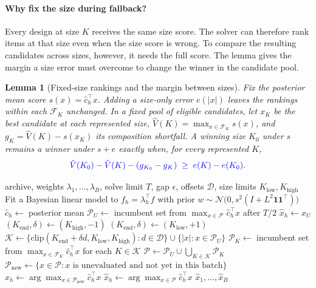 \documentclass{article}
\newcommand{\revtext}[1]{{\color{blue}#1}}
\providecommand{\one}{\mathbf 1}
\providecommand{\F}{\mathcal F}
\newtheorem{lemma}[proposition]{Lemma}
\theoremstyle{remark}\newtheorem{remark}[proposition]{Remark}
\begin{document}
\paragraph{\revtext{Why fix the size during fallback?}}
\revtext{Every design at size $K$ receives the same size score. The solver can therefore rank items at that size even when the size score is wrong. To compare the resulting candidates across sizes, however, it needs the full score. The lemma gives the margin a size error must overcome to change the winner in the candidate pool.}
\begin{lemma}[\revtext{Fixed-size rankings and the margin between sizes}]\label{prop:inv}
\revtext{Fix the posterior mean score $s(x)=\hat c_h^\top x$. Adding a size-only error $e(|x|)$ leaves the rankings within each $\F_K$ unchanged. In a fixed pool of eligible candidates, let $x_K$ be the best candidate at each represented size, $\hat V(K)=\max_{x\in\F_K}s(x)$, and $g_K=\hat V(K)-s(x_K)$ its composition shortfall. A winning size $K_0$ under $s$ remains a winner under $s+e$ exactly when, for every represented $K$,}
\begin{equation}\label{eq:fallback-margin}
{\color{blue}\hat V(K_0)-\hat V(K)-(g_{K_0}-g_K) \;\ge\; e(K)-e(K_0).}
\end{equation}
\end{lemma}

\begin{algorithm}[t]
\caption{\revtext{One C3BO batch}}
\label{alg:c3bo}
\small\color{blue}
\begin{algorithmic}[1]
\Require archive, weights $\lambda_1,\dots,\lambda_B$, solve limit $T$, gap $\epsilon$, offsets $\mathcal D$, size limits $K_{\mathrm{low}},K_{\mathrm{high}}$
  \State Fit a Bayesian linear model to $f_h=\lambda_h^\top f$ with prior $w\sim\mathcal N\bigl(0,s^2(I+L^2\one\one^\top)\bigr)$ \label{line:prior}
  \State $\hat c_h\gets$ posterior mean
  \State $\mathcal P_U\gets$ incumbent set from $\max_{x\in\F}\hat c_h^\top x$ after $T/2$ \label{line:solve}
    \State $\hat x_h\gets x_U$
  \Else
    \If{$\one^\top\hat c_h\ge 0$}
      \State $(K_{\mathrm{end}},\delta)\gets(K_{\mathrm{high}},-1)$
    \Else
      \State $(K_{\mathrm{end}},\delta)\gets(K_{\mathrm{low}},+1)$
    \EndIf
    \State $\mathcal K\gets\{\mathrm{clip}(K_{\mathrm{end}}+\delta d,K_{\mathrm{low}},K_{\mathrm{high}}):d\in\mathcal D\}\cup\{|x|:x\in\mathcal P_U\}$
    \State $\mathcal P_K\gets$ incumbent set from $\max_{x\in\F_K}\hat c_h^\top x$ for each $K\in\mathcal K$
    \State $\mathcal P\gets\mathcal P_U\cup\bigcup_{K\in\mathcal K}\mathcal P_K$
    \State $\mathcal P_{\mathrm{new}}\gets\{x\in\mathcal P:x\text{ is unevaluated and not yet in this batch}\}$
     \label{line:pick}
      \State $\hat x_h\gets\arg\max_{x\in\mathcal P_{\mathrm{new}}}\hat c_h^\top x$
    \Else
      \State $\hat x_h\gets\arg\max_{x\in\mathcal P}\hat c_h^\top x$
    \EndIf
  \EndIf
\EndFor
\State \Return $\hat x_1,\dots,\hat x_B$
\end{algorithmic}
\end{algorithm}
\end{document}
